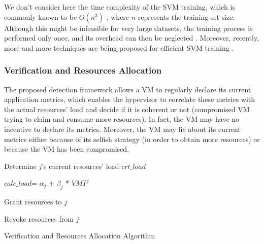 \documentclass[twocolumn]{bmcart}%
\begin{document}
We don't consider here the time complexity of the SVM training, which is commonly known to be $O(n^{3})$ \cite{wahab2016ceap}, where $n$ represents the training set size. Although this might be infeasible for very large datasets, the training process is performed only once, and its overhead can then be neglected \cite{auria2008support} \cite{konar2005supervised}. Moreover, recently, more and more techniques are being proposed for efficient SVM training \cite{fine2001efficient} \cite{tsang2005core} \cite{dong2005fast}.

\subsubsection*{Verification and Resources Allocation}

The proposed detection framework allows a VM to regularly declare its current application metrics, which enables the hypervisor to correlate these metrics with the actual resources' load and decide if it is coherent or not (compromised VM trying to claim and consume more resources). In fact, the VM may have no incentive to declare its metrics. Moreover, the VM may lie about its current metrics either because of its selfish strategy (in order to obtain more resources) or because the VM has been compromised.

\begin{algorithm}[h]
    \LinesNumbered
    \Initialization{}

{
Determine $j$'s current resources' load $crt\_load$

$calc\_load$= $\alpha_{j}$ + $\beta_{j}$ * $VMT^{j}$

{
        Grant resources to $j$
}

\Else
{
        Revoke resources from $j$

}
}
\caption{Verification and Resources Allocation Algorithm}
\end{algorithm}
\end{document}
